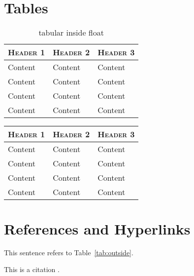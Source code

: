 \documentclass[a4paper,11pt,oneside,showtrims]{alpenthesis}
\begin{document}
\scshape\lipsum[8]

\scslshape\lipsum[9]

\normalfont

\chapter{Tables}
\begin{table}
    \centering
    \caption{tabular inside float}
    \label{tab:float}
    \begin{tabular}{lll}
        \toprule
        \scshape Header 1 & \scshape Header 2 & \scshape Header 3 \\
        \midrule
        Content           & Content           & Content           \\
        Content           & Content           & Content           \\
        Content           & Content           & Content           \\
        Content           & Content           & Content           \\
        \bottomrule
    \end{tabular}
\end{table}

\lipsum[3]

\begin{center}
    \label{tab:outside}
    \begin{tabular}{lll}
        \toprule
        \scshape Header 1 & \scshape Header 2 & \scshape Header 3 \\
        \midrule
        Content           & Content           & Content           \\
        Content           & Content           & Content           \\
        Content           & Content           & Content           \\
        Content           & Content           & Content           \\
        \bottomrule
    \end{tabular}
\end{center}

\chapter{References and Hyperlinks}
This sentence refers to Table~\ref{tab:outside}.

This is a citation \cite{testitem}.
\end{document}
